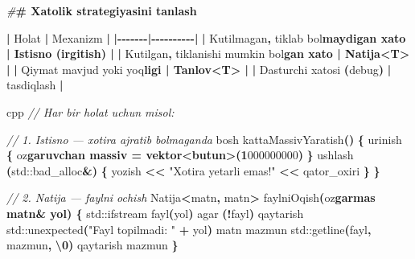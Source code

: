 \documentclass[a4paper,11pt,twoside,openright]{book}
\newenvironment{Shaded}{\begin{snugshade}}{\end{snugshade}}
\newcommand{\BaseNTok}[1]{\textcolor[rgb]{0.00,0.00,0.81}{#1}}
\newcommand{\BuiltInTok}[1]{#1}
\newcommand{\CharTok}[1]{\textcolor[rgb]{0.31,0.60,0.02}{#1}}
\newcommand{\CommentTok}[1]{\textcolor[rgb]{0.56,0.35,0.01}{\textit{#1}}}
\newcommand{\ErrorTok}[1]{\textcolor[rgb]{0.64,0.00,0.00}{\textbf{#1}}}
\newcommand{\NormalTok}[1]{#1}
\newcommand{\OperatorTok}[1]{\textcolor[rgb]{0.81,0.36,0.00}{\textbf{#1}}}
\newcommand{\PreprocessorTok}[1]{\textcolor[rgb]{0.56,0.35,0.01}{\textit{#1}}}
\newcommand{\SpecialCharTok}[1]{\textcolor[rgb]{0.81,0.36,0.00}{\textbf{#1}}}
\newcommand{\StringTok}[1]{\textcolor[rgb]{0.31,0.60,0.02}{#1}}
\begin{document}
\begin{Shaded}
\begin{Highlighting}[]
\PreprocessorTok{\#}\ErrorTok{\# Xatolik strategiyasini tanlash}

\OperatorTok{|}\NormalTok{ Holat }\OperatorTok{|}\NormalTok{ Mexanizm }\OperatorTok{|}
\OperatorTok{|{-}{-}{-}{-}{-}{-}{-}|{-}{-}{-}{-}{-}{-}{-}{-}{-}{-}|}
\OperatorTok{|}\NormalTok{ Kutilmagan}\OperatorTok{,}\NormalTok{ tiklab bo}\CharTok{\textquotesingle{}l}\ErrorTok{maydigan xato | Istisno (\textasciigrave{}irgitish\textasciigrave{}) |}
\OperatorTok{|}\NormalTok{ Kutilgan}\OperatorTok{,}\NormalTok{ tiklanishi mumkin bo}\CharTok{\textquotesingle{}l}\ErrorTok{gan xato | \textasciigrave{}Natija\textless{}T\textgreater{}\textasciigrave{} |}
\OperatorTok{|}\NormalTok{ Qiymat mavjud yoki yo}\CharTok{\textquotesingle{}q}\ErrorTok{ligi | \textasciigrave{}Tanlov\textless{}T\textgreater{}\textasciigrave{} |}
\OperatorTok{|}\NormalTok{ Dasturchi xatosi }\OperatorTok{(}\NormalTok{debug}\OperatorTok{)} \OperatorTok{|} \ErrorTok{\textasciigrave{}}\NormalTok{tasdiqlash}\ErrorTok{\textasciigrave{}} \OperatorTok{|}

\ErrorTok{\textasciigrave{}\textasciigrave{}\textasciigrave{}}\NormalTok{cpp}
\CommentTok{// Har bir holat uchun misol:}

\CommentTok{// 1. Istisno — xotira ajratib bo\textquotesingle{}lmaganda}
\NormalTok{bosh kattaMassivYaratish}\OperatorTok{()} \OperatorTok{\{}
\NormalTok{    urinish }\OperatorTok{\{}
\NormalTok{        o}\CharTok{\textquotesingle{}z}\ErrorTok{garuvchan massiv = vektor\textless{}butun\textgreater{}(1}\CharTok{\textquotesingle{}}\BaseNTok{000\textquotesingle{}000\textquotesingle{}000}\OperatorTok{)}
    \OperatorTok{\}}\NormalTok{ ushlash }\OperatorTok{(}\BuiltInTok{std::}\NormalTok{bad\_alloc}\OperatorTok{\&)} \OperatorTok{\{}
\NormalTok{        yozish }\OperatorTok{\textless{}\textless{}} \StringTok{"Xotira yetarli emas!"} \OperatorTok{\textless{}\textless{}}\NormalTok{ qator\_oxiri}
    \OperatorTok{\}}
\OperatorTok{\}}

\CommentTok{// 2. Natija — faylni ochish}
\NormalTok{Natija}\OperatorTok{\textless{}}\NormalTok{matn}\OperatorTok{,}\NormalTok{ matn}\OperatorTok{\textgreater{}}\NormalTok{ faylniOqish}\OperatorTok{(}\NormalTok{o}\CharTok{\textquotesingle{}z}\ErrorTok{garmas matn\& yol) \{}
    \BuiltInTok{std::}\NormalTok{ifstream fayl}\OperatorTok{(}\NormalTok{yol}\OperatorTok{)}
\NormalTok{    agar }\OperatorTok{(!}\NormalTok{fayl}\OperatorTok{)}\NormalTok{ qaytarish }\BuiltInTok{std::}\NormalTok{unexpected}\OperatorTok{(}\StringTok{"Fayl topilmadi: "} \OperatorTok{+}\NormalTok{ yol}\OperatorTok{)}
\NormalTok{    matn mazmun}
    \BuiltInTok{std::}\NormalTok{getline}\OperatorTok{(}\NormalTok{fayl}\OperatorTok{,}\NormalTok{ mazmun}\OperatorTok{,} \CharTok{\textquotesingle{}}\SpecialCharTok{\textbackslash{}0}\CharTok{\textquotesingle{}}\OperatorTok{)}
\NormalTok{    qaytarish mazmun}
\OperatorTok{\}}


\end{Highlighting}
\end{Shaded}
\end{document}
